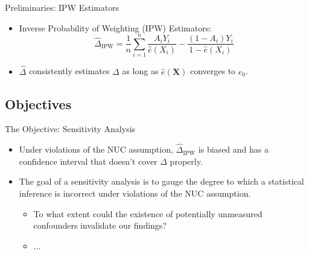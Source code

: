 \documentclass{beamer}
\begin{document}

\begin{frame}{Preliminaries: IPW Estimators}

\begin{itemize}
  \itemsep12pt
  \item Inverse Probability of Weighting (IPW) Estimators:
    \[
      \hat{\Delta}_{\text{IPW}} = \frac{1}{n} \sum_{i = 1}^n
      \frac{A_iY_i}{\hat{e}(X_i)} - \frac{(1 - A_i)Y_i}{1 - \hat{e}(X_i)}
    \]
  \item $\hat{\Delta}$ consistently estimates $\Delta$ as long as
    $\hat{e}(\bm{X})$ converges to $e_0$.
\end{itemize}

\end{frame}

\subsection{Objectives}

\begin{frame}{The Objective: Sensitivity Analysis}

\begin{itemize}
  \itemsep12pt
  \item Under violations of the NUC assumption, $\hat{\Delta}_{\text{IPW}}$ is
    biased and has a confidence interval that doesn't cover $\Delta$ properly.
  \item The goal of a sensitivity analysis is to gauge the degree to which a
    statistical inference is incorrect under violations of the NUC assumption.
    \begin{itemize}
      \itemsep6pt
      \item To what extent could the existence of potentially unmeasured
        confounders invalidate our findings?
      \item ...
    \end{itemize}
\end{itemize}

\end{frame}

\end{document}
